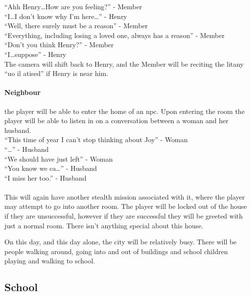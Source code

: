 \documentclass[12pt, a4paper, titlepage]{article}
\begin{document}
            ``Ahh Henry\ldots How are you feeling?'' - Member\\
            ``I\ldots I don't know why I'm here\ldots'' - Henry\\
            ``Well, there surely must be a reason'' - Member\\
            ``Everything, including losing a loved one, always has a reason'' - Member\\
            ``Don't you think Henry?'' - Member\\
            ``I\ldots suppose'' - Henry\\
            
            The camera will shift back to Henry, and the Member will be reciting the litany ``uo il atised'' if Henry is near him.
            
            \paragraph{Neighbour} the player will be able to enter the home of an npc. Upon entering the room the player will be able to listen in on a conversation between a woman and
            her husband.\\
            
            ``This time of year I can't stop thinking about Joy'' - Woman\\
            ``\ldots'' - Husband\\
            ``We should have just left'' - Woman\\
            ``You know we ca\ldots'' - Husband\\
            ``I miss her too.'' - Husband\\~\\
                          
            This will again have another stealth mission associated with it, where the player may
            attempt to go into another room. The player will be locked out of the house if they are unsuccessful, however if they are successful they will be greeted with just
            a normal room. There isn't anything special about this house.
            

            On this day, and this day alone, the city will be relatively busy. There will be people walking around, going into and out of buildings and school children
            playing and walking to school.

        \subsection{School}
\end{document}

